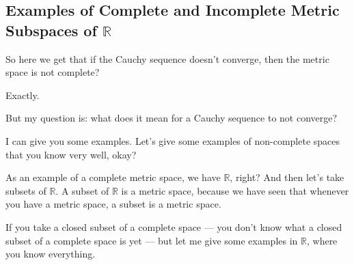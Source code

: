 \subsection{Examples of Complete and Incomplete Metric Subspaces of \texorpdfstring{$\mathbb{R}$}{R}}

\begin{student}
So here we get that if the Cauchy sequence doesn't converge, then the metric space is not complete?
\end{student}

\begin{speech}[00:54:08 - 00:54:09]
Exactly.
\end{speech}

\begin{student}
But my question is: what does it mean for a Cauchy sequence to not converge?
\end{student}

\begin{speech}[00:54:15 - 00:55:45]
I can give you some examples. Let's give some examples of non-complete spaces that you know very well, okay?

As an example of a complete metric space, we have $\mathbb{R}$, right? And then let's take subsets of $\mathbb{R}$. A subset of $\mathbb{R}$ is a metric space, because we have seen that whenever you have a metric space, a subset is a metric space.

If you take a closed subset of a complete space  --- you don't know what a closed subset of a complete space is yet --- but let me give some examples in $\mathbb{R}$, where you know everything.
\end{speech}

